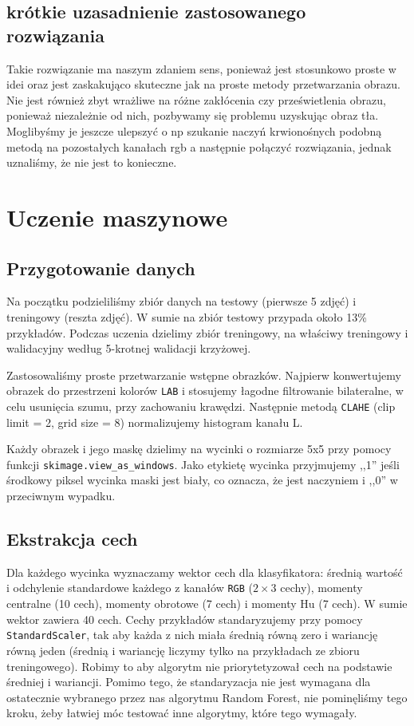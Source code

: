 \documentclass[11pt]{article}
\def\code#1{\texttt{#1}}
\begin{document}
\subsection{krótkie uzasadnienie zastosowanego rozwiązania}

Takie rozwiązanie ma naszym zdaniem sens, ponieważ jest stosunkowo proste w idei oraz jest zaskakująco skuteczne jak na proste metody przetwarzania obrazu. Nie jest również zbyt wrażliwe na różne zakłócenia czy prześwietlenia obrazu, ponieważ niezależnie od nich, pozbywamy się problemu uzyskując obraz tła. Moglibyśmy je jeszcze ulepszyć o np szukanie naczyń krwionośnych podobną metodą na pozostałych kanałach rgb a następnie połączyć rozwiązania, jednak uznaliśmy, że nie jest to konieczne.

\section{Uczenie maszynowe}

\subsection{Przygotowanie danych}

Na początku podzieliliśmy zbiór danych na testowy (pierwsze 5 zdjęć) i treningowy (reszta zdjęć).
W sumie na zbiór testowy przypada około 13\% przykładów.
Podczas uczenia dzielimy zbiór treningowy, na właściwy treningowy i walidacyjny według 5-krotnej walidacji krzyżowej.

Zastosowaliśmy proste przetwarzanie wstępne obrazków.
Najpierw konwertujemy obrazek do przestrzeni kolorów \code{LAB} i
stosujemy łagodne filtrowanie bilateralne, w celu usunięcia szumu, przy zachowaniu krawędzi.
Następnie metodą \code{CLAHE} (clip limit = 2, grid size = 8) normalizujemy histogram kanału L.

Każdy obrazek i jego maskę dzielimy na wycinki o rozmiarze 5x5 przy pomocy funkcji \newline \code{skimage.view\_as\_windows}.
Jako etykietę wycinka przyjmujemy ,,1'' jeśli środkowy piksel wycinka maski jest biały, co oznacza, że jest naczyniem i ,,0'' w przeciwnym wypadku.

\subsection{Ekstrakcja cech}

Dla każdego wycinka wyznaczamy wektor cech dla klasyfikatora: średnią wartość i odchylenie standardowe każdego z kanałów \code{RGB} ($2 \times 3$ cechy), momenty centralne (10 cech), momenty obrotowe (7 cech) i momenty Hu (7 cech). W sumie wektor zawiera 40 cech. Cechy przykładów standaryzujemy przy pomocy \code{StandardScaler}, tak aby każda z nich miała średnią równą zero i wariancję równą jeden (średnią i wariancję liczymy tylko na przykładach ze zbioru treningowego). Robimy to aby algorytm nie priorytetyzował cech na podstawie średniej i wariancji. Pomimo tego, że standaryzacja nie jest wymagana dla ostatecznie wybranego przez nas algorytmu Random Forest, nie pominęliśmy tego kroku, żeby łatwiej móc testować inne algorytmy, które tego wymagały.
\end{document}
